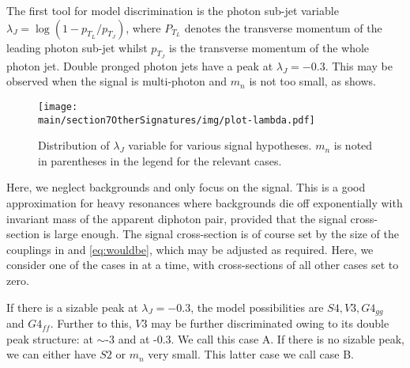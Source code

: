 The first tool for model discrimination is the photon sub-jet variable $\lambda_J=\log(1-p_{T_L}/p_{T_J})$, where $P_{T_L}$ denotes the transverse momentum of the leading photon sub-jet whilst $p_{T_J}$ is the transverse momentum of the whole photon jet. Double pronged photon jets have a peak at $\lambda_J=-0.3$. This may be observed when the signal is multi-photon and $m_n$ is not too small, as  shows.
\begin{figure}
\begin{center}
\texttt{[image: \\main/section7OtherSignatures/img/plot-lambda.pdf]}
\caption{Distribution of $\lambda_J$ variable for various signal hypotheses. $m_n$ is noted in parentheses in the legend for the relevant cases.\label{fig:lambdaj}}
\end{center}
\end{figure}

Here, we neglect backgrounds and only focus on the signal. This is a good approximation for heavy resonances where backgrounds die off exponentially with invariant mass of the apparent diphoton pair, provided that the signal cross-section is large enough. The signal cross-section is of course set by the size of the couplings in  and \eqref{eq:wouldbe}, which may be adjusted as required. Here, we consider one of the cases in  at a time, with cross-sections of all other cases set to zero. 

If there is a sizable peak at $\lambda_J=-0.3$, the model possibilities are $S4,V3,G4_{gg}$ and $G4_{ff}$. Further to this, $V3$ may be further discriminated owing to its double peak structure: at $\sim$-3 and at -0.3. We call this case A.
If there is no sizable peak, we can either have $S2$ or $m_n$ very small. This latter case we call case B.

